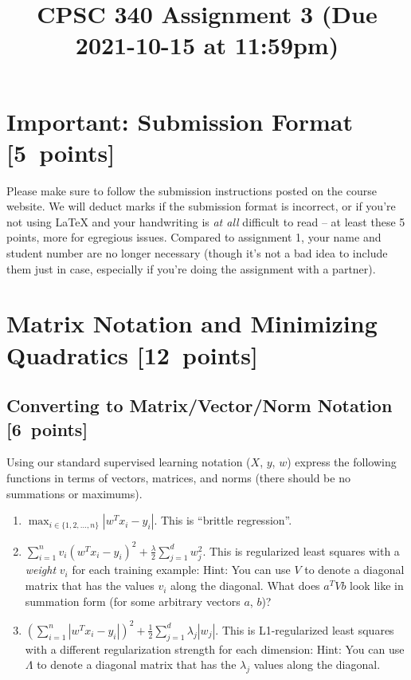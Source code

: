 \documentclass{article}
\newcommand{\blu}[1]{{\textcolor{blu}{#1}}}
\let\ask\blu
\newcommand\pts[1]{\textcolor{pointscolour}{[#1~points]}}
\begin{document}
\title{CPSC 340 Assignment 3 (Due 2021-10-15 at 11:59pm)}
\date{}
\maketitle


\vspace{-4em}



\section*{Important: Submission Format \pts{5}}

    Please make sure to follow the submission instructions posted on the course website.
    \ask{We will deduct marks if the submission format is incorrect, or if you're not using \LaTeX{} and your handwriting is \emph{at all} difficult to read} -- at least these 5 points, more for egregious issues.
    Compared to assignment 1, your name and student number are no longer necessary (though it's not a bad idea to include them just in case, especially if you're doing the assignment with a partner).


\section{Matrix Notation and Minimizing Quadratics \pts{12}}


\subsection{Converting to Matrix/Vector/Norm Notation \pts{6}}

Using our standard supervised learning notation ($X$, $y$, $w$)
\ask{express the following functions in terms of vectors, matrices, and norms} (there should be no summations or maximums).
\begin{enumerate}
\item $\max_{i \in \{1,2,\dots,n\}}  |w^Tx_i - y_i|$. This is ``brittle regression''.
%
\item $\sum_{i=1}^n v_i(w^Tx_i  - y_i)^2 + \frac{\lambda}{2}\sum_{j=1}^d w_j^2$. This is regularized least squares with a \emph{weight} $v_i$ for each training example:  Hint: You can use $V$ to denote a diagonal matrix that has the values $v_i$ along the diagonal. What does $a^T V b$ look like in summation form (for some arbitrary vectors $a$, $b$)?
%
\item $\left(\sum_{i=1}^n |w^Tx_i - y_i|\right)^2 +  \frac12 \sum_{j=1}^{d} \lambda_j|w_j|$. This is L1-regularized least squares with a different regularization strength for each dimension: Hint: You can use  $\Lambda$ to denote a diagonal matrix that has the $\lambda_j$ values along the diagonal.
%
\end{enumerate}
\end{document}
